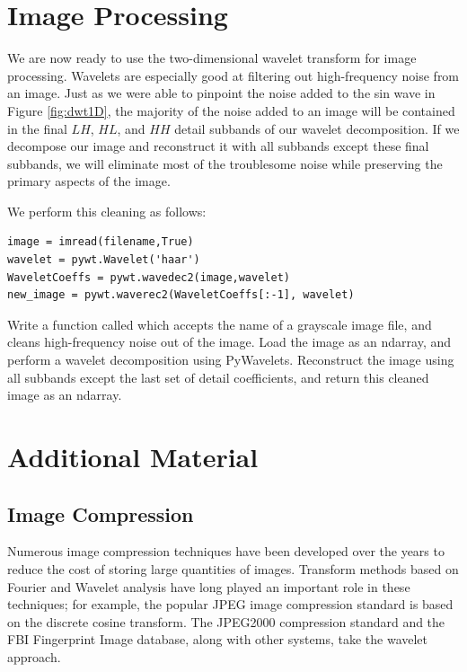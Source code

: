 \section*{Image Processing}
We are now ready to use the two-dimensional wavelet transform for image processing.
Wavelets are especially good at filtering out high-frequency noise from an image.
Just as we were able to pinpoint the noise added to the sin wave in Figure \ref{fig:dwt1D}, the majority of the noise added to an image will be contained in the final $LH$, $HL$, and $HH$ detail subbands of our wavelet decomposition.
If we decompose our image and reconstruct it with all subbands except these final subbands, we will eliminate most of the troublesome noise while preserving the primary aspects of the image.

We perform this cleaning as follows:
\begin{lstlisting}
image = imread(filename,True)
wavelet = pywt.Wavelet('haar')
WaveletCoeffs = pywt.wavedec2(image,wavelet)
new_image = pywt.waverec2(WaveletCoeffs[:-1], wavelet)
\end{lstlisting}

\begin{problem}
Write a function called  which accepts the name of a grayscale image file, and cleans high-frequency noise out of the image.
Load the image as an ndarray, and perform a wavelet decomposition using PyWavelets.
Reconstruct the image using all subbands except the last set of detail coefficients, and return this cleaned image as an ndarray.
\end{problem}

\newpage

\section*{Additional Material}

\subsection*{Image Compression} %

Numerous image compression techniques have been developed over the years to reduce the cost of storing large quantities of images.
Transform methods based on Fourier and Wavelet analysis have long played an important role in these techniques; for example, the popular JPEG image compression standard is based on the discrete cosine transform.
The JPEG2000 compression standard and the FBI Fingerprint Image database, along with other systems, take the wavelet approach.

